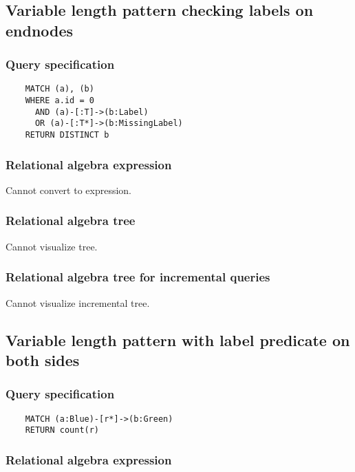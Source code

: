 	\subsection{Variable length pattern checking labels on endnodes}

	\subsubsection*{Query specification}

	\begin{lstlisting}
	MATCH (a), (b)
	WHERE a.id = 0
	  AND (a)-[:T]->(b:Label)
	  OR (a)-[:T*]->(b:MissingLabel)
	RETURN DISTINCT b
	\end{lstlisting}


	\subsubsection*{Relational algebra expression}

	Cannot convert to expression.

	\subsubsection*{Relational algebra tree}

	Cannot visualize tree.

	\subsubsection*{Relational algebra tree for incremental queries}

	Cannot visualize incremental tree.
	\subsection{Variable length pattern with label predicate on both sides}

	\subsubsection*{Query specification}

	\begin{lstlisting}
	MATCH (a:Blue)-[r*]->(b:Green)
	RETURN count(r)
	\end{lstlisting}


	\subsubsection*{Relational algebra expression}

